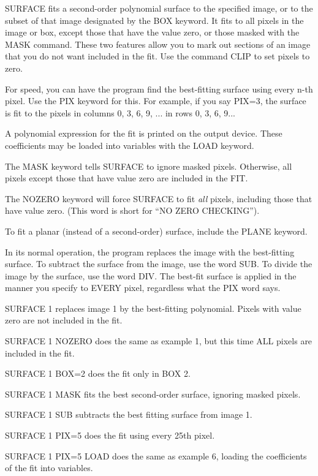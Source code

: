 SURFACE fits a second-order polynomial surface to the specified image, or
to the subset of that image designated by the BOX keyword.  It fits to all
pixels in the image or box, except those that have the value zero, or those
masked with the MASK command. These two features allow you to mark out
sections of an image that you do not want included in the fit.  Use the
command CLIP to set pixels to zero.

For speed, you can have the program find the best-fitting surface using
every n-th pixel.  Use the PIX keyword for this. For example, if you say
PIX=3, the surface is fit to the pixels in columns 0, 3, 6, 9, ... in rows
0, 3, 6, 9...

A polynomial expression for the fit is printed on the output device.  These
coefficients may be loaded into variables with the LOAD keyword.

The MASK keyword tells SURFACE to ignore masked pixels.  Otherwise, all
pixels except those that have value zero are included in the FIT.  

The NOZERO keyword will force SURFACE to fit \textit{all} pixels, including
those that have value zero.  (This word is short for ``NO ZERO
CHECKING''). 

To fit a planar (instead of a second-order) surface, include the PLANE
keyword.

In its normal operation, the program replaces the image with the
best-fitting surface.  To subtract the surface from the image, use the word
SUB.  To divide the image by the surface, use the word DIV.  The best-fit
surface is applied in the manner you specify to EVERY pixel, regardless
what the PIX word says.


\begin{example}
  \item[SURFACE 1\hfill]{replaces image 1 by the best-fitting
       polynomial.  Pixels with value zero are not included in the fit.}
  \item[SURFACE 1 NOZERO\hfill]{does the same as example 1, but this
       time ALL pixels are included in the fit.}
  \item[SURFACE 1 BOX=2\hfill]{does the fit only in BOX 2.}
  \item[SURFACE 1 MASK\hfill]{fits the best second-order surface, ignoring
       masked pixels.}
  \item[SURFACE 1 SUB\hfill]{subtracts the best fitting surface from image 1.}
  \item[SURFACE 1 PIX=5\hfill]{does the fit using every 25th pixel.}
  \item[SURFACE 1 PIX=5 LOAD\hfill]{does the same as example 6, loading the
       coefficients of the fit into variables.}
\end{example}

